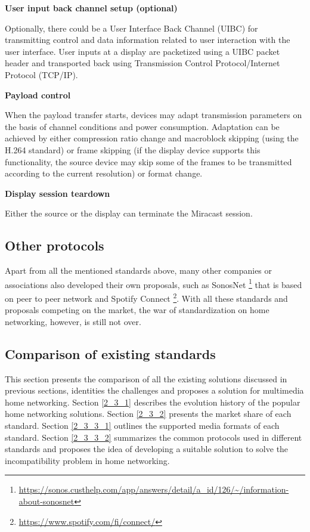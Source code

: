 \textbf{User input back channel setup (optional)}

Optionally, there could be a User Interface Back Channel (UIBC) for transmitting
control and data information related to user interaction with the user interface. User inputs at a display are packetized using a UIBC packet header and transported back using Transmission Control Protocol/Internet Protocol (TCP/IP).

\textbf{Payload control}

When the payload transfer starts, devices may adapt transmission parameters on
the basis of channel conditions and power consumption. Adaptation can be achieved by either compression ratio change and macroblock skipping (using the H.264 standard) or frame skipping (if the display device supports this functionality, the source device may skip some of the frames to be transmitted according to the current resolution) or format change.

\textbf{Display session teardown}

Either the source or the display can terminate the Miracast session.
\subsection{Other protocols\label{2_2_6}}
Apart from all the mentioned standards above, many other companies or associations 
also developed their own proposals, such as SonosNet \cite{sonosnet}
\footnote{\url{https://sonos.custhelp.com/app/answers/detail/a_id/126/~/information-about-sonosnet}}
that is based on peer to peer network and Spotify Connect \cite{spotifyconnect}
\footnote{\url{https://www.spotify.com/fi/connect/}}. With all these standards
and proposals competing on the market, the war of standardization on home
networking, however, is still not over.

\subsection{Comparison of existing standards\label{2_3}} 
This section presents the comparison of all the existing solutions discussed in
previous sections, identities the challenges and proposes a solution for
multimedia home networking. Section \ref{2_3_1} describes the evolution history
of the popular home networking solutions. Section \ref{2_3_2} presents the
market share of each standard. Section \ref{2_3_3_1} outlines the supported
media formats of each standard. Section \ref{2_3_3_2} summarizes the common
protocols used in different standards and proposes the idea of developing a
suitable solution to solve the incompatibility problem in home networking.
